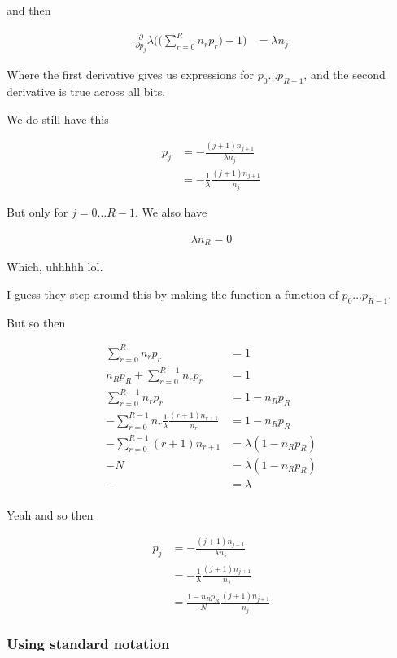 \documentclass{article}
\begin{document}
			and then
			
			\begin{align}
				\frac{\partial}{\partial p_j} \lambda \bigg(\bigg(\sum^R_{r=0} n_r p_r\bigg)-1\bigg) &= \lambda n_j
			\end{align}
			
			Where the first derivative gives us expressions for $p_0\ldots p_{R-1}$, and the second derivative is true across all bits.
			
			We do still have this
			
			\begin{align}
				p_j  &= - \frac{(j+1)n_{j+1}}{\lambda n_j}\\
				&= - \frac{1}{\lambda}\frac{(j+1)n_{j+1}}{n_j}
			\end{align}
			
			But only for $j=0\ldots R-1$. We also have
			
			\begin{align}
				\lambda n_R = 0
			\end{align}
			
			Which, uhhhhh lol.
			
			I guess they step around this by making the function a function of $p_0\ldots p_{R-1}$.
			
			But so then
		
			\begin{align}
				\sum^R_{r=0} n_r p_r &= 1\\
				n_Rp_R + \sum^{R-1}_{r=0} n_r p_r &= 1\\
				\sum^{R-1}_{r=0} n_r p_r &= 1-n_R p_R\\
				-\sum^{R-1}_{r=0} n_r \frac{1}{\lambda}\frac{(r+1)n_{r+1}}{n_r} &= 1-n_R p_R\\
				-\sum^{R-1}_{r=0} (r+1)n_{r+1} &= \lambda(1-n_R p_R)\\
				-N &= \lambda(1-n_R p_R)\\
				- &= \lambda\\
			\end{align}
		
			Yeah and so then 
		
			\begin{align}
				p_j  &= - \frac{(j+1)n_{j+1}}{\lambda n_j}\\
				&= - \frac{1}{\lambda}\frac{(j+1)n_{j+1}}{n_j}\\
				&= \frac{1-n_R p_R}{N}\frac{(j+1)n_{j+1}}{n_j}
			\end{align}
			
			
		\subsubsection{Using standard notation}
			
\end{document}
